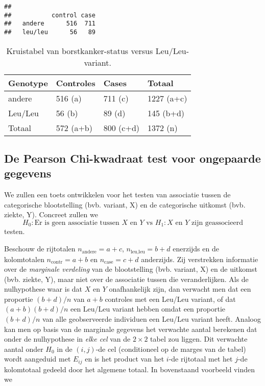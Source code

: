 \documentclass[12pt,dutch,coursenotes]{book}
\theoremstyle{definition}
\theoremstyle{definition}
\theoremstyle{definition}
\theoremstyle{remark}
\begin{document}
\begin{verbatim}
##          
##           control case
##   andere      516  711
##   leu/leu      56   89
\end{verbatim}

\begin{table}

\caption{\label{tab:leu4}Kruistabel van borstkanker-status versus Leu/Leu-variant.}
\centering
\begin{tabular}[t]{llll}
\toprule
Genotype & Controles & Cases & Totaal\\
\midrule
andere & 516 (a) & 711 (c) & 1227 (a+c)\\
Leu/Leu & 56 (b) & 89 (d) & 145 (b+d)\\
Totaal & 572 (a+b) & 800 (c+d) & 1372 (n)\\
\bottomrule
\end{tabular}
\end{table}

\subsection{De Pearson Chi-kwadraat test voor ongepaarde
gegevens}\label{de-pearson-chi-kwadraat-test-voor-ongepaarde-gegevens}

We zullen een toets ontwikkelen voor het testen van associatie tussen de
categorische blootstelling (bvb. variant, X) en de categorische uitkomst
(bvb. ziekte, Y). Concreet zullen we
\[H_0: \text{Er is geen associatie tussen } X \text{ en } Y \text{ vs } H_1: X \text{ en } Y \text{ zijn geassocieerd}\]
testen.

Beschouw de rijtotalen \(n_\text{andere}=a+c\), \(n_\text{leu,leu}=b+d\)
enerzijds en de kolomtotalen \(n_\text{contr}=a+b\) en
\(n_\text{case}=c+d\) anderzijds. Zij verstrekken informatie over de
\emph{marginale verdeling} van de blootstelling (bvb. variant, X) en de
uitkomst (bvb. ziekte, Y), maar niet over de associatie tussen die
veranderlijken. Als de nulhypothese waar is dat \(X\) en \(Y\)
onafhankelijk zijn, dan verwacht men dat een proportie \((b+d)/n\) van
\(a+b\) controles met een Leu/Leu variant, of dat \((a+b)(b+d)/n\) een
Leu/Leu variant hebben omdat een proportie \((b+d)/n\) van alle
geobserveerde individuen een Leu/Leu variant heeft. Analoog kan men op
basis van de marginale gegevens het verwachte aantal berekenen dat onder
de nulhypothese in \emph{elke cel} van de \(2\times 2\) tabel zou
liggen. Dit verwachte aantal onder \(H_0\) in de \((i,j)\)-de cel
(conditioneel op de marges van de tabel) wordt aangeduid met \(E_{ij}\)
en is het product van het \(i\)-de rijtotaal met het \(j\)-de
kolomtotaal gedeeld door het algemene totaal. In bovenstaand voorbeeld
vinden we
\end{document}
